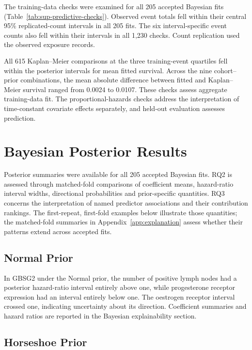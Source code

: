 The training-data checks were examined for all 205 accepted Bayesian fits (Table~\ref{tab:sup-predictive-checks}). Observed event totals fell within their central 95\% replicated-count intervals in all 205 fits. The six interval-specific event counts also fell within their intervals in all 1,230 checks. Count replication used the observed exposure records.

All 615 Kaplan--Meier comparisons at the three training-event quartiles fell within the posterior intervals for mean fitted survival. Across the nine cohort--prior combinations, the mean absolute difference between fitted and Kaplan--Meier survival ranged from 0.0024 to 0.0107. These checks assess aggregate training-data fit. The proportional-hazards checks address the interpretation of time-constant covariate effects separately, and held-out evaluation assesses prediction.

\section{Bayesian Posterior Results}\label{bayesian-posterior-results}

Posterior summaries were available for all 205 accepted Bayesian fits. RQ2 is assessed through matched-fold comparisons of coefficient means, hazard-ratio interval widths, directional probabilities and prior-specific quantities. RQ3 concerns the interpretation of named predictor associations and their contribution rankings. The first-repeat, first-fold examples below illustrate those quantities; the matched-fold summaries in Appendix~\ref{app:explanation} assess whether their patterns extend across accepted fits.

\subsection{Normal Prior}\label{normal-prior-1}

In GBSG2 under the Normal prior, the number of positive lymph nodes had a posterior hazard-ratio interval entirely above one, while progesterone receptor expression had an interval entirely below one. The oestrogen receptor interval crossed one, indicating uncertainty about its direction. Coefficient summaries and hazard ratios are reported in the Bayesian explainability section.

\subsection{Horseshoe Prior}\label{horseshoe-prior-1}

